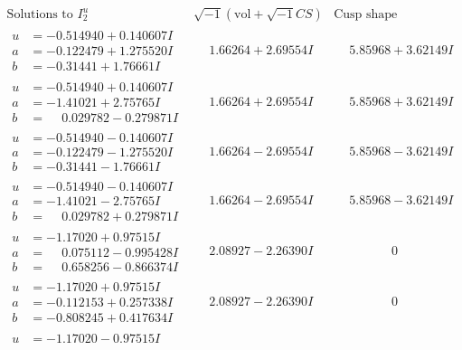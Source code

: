 \documentclass[1p]{elsarticle_modified}
\theoremstyle{definition}
\newcommand{\I}{\sqrt{-1}}
\begin{document}
$$\begin{array}{c|c|c}
\text{Solutions to }I^u_{2}& \I (\text{vol} + \sqrt{-1}CS) & \text{Cusp shape}\\
 \hline 
\begin{aligned}
u &= -0.514940 + 0.140607 I \\
a &= -0.122479 + 1.275520 I \\
b &= -0.31441 + 1.76661 I\end{aligned}
 & \phantom{-}1.66264 + 2.69554 I & \phantom{-}5.85968 + 3.62149 I \\ \hline\begin{aligned}
u &= -0.514940 + 0.140607 I \\
a &= -1.41021 + 2.75765 I \\
b &= \phantom{-}0.029782 - 0.279871 I\end{aligned}
 & \phantom{-}1.66264 + 2.69554 I & \phantom{-}5.85968 + 3.62149 I \\ \hline\begin{aligned}
u &= -0.514940 - 0.140607 I \\
a &= -0.122479 - 1.275520 I \\
b &= -0.31441 - 1.76661 I\end{aligned}
 & \phantom{-}1.66264 - 2.69554 I & \phantom{-}5.85968 - 3.62149 I \\ \hline\begin{aligned}
u &= -0.514940 - 0.140607 I \\
a &= -1.41021 - 2.75765 I \\
b &= \phantom{-}0.029782 + 0.279871 I\end{aligned}
 & \phantom{-}1.66264 - 2.69554 I & \phantom{-}5.85968 - 3.62149 I \\ \hline\begin{aligned}
u &= -1.17020 + 0.97515 I \\
a &= \phantom{-}0.075112 - 0.995428 I \\
b &= \phantom{-}0.658256 - 0.866374 I\end{aligned}
 & \phantom{-}2.08927 - 2.26390 I & \phantom{-0.000000 } 0 \\ \hline\begin{aligned}
u &= -1.17020 + 0.97515 I \\
a &= -0.112153 + 0.257338 I \\
b &= -0.808245 + 0.417634 I\end{aligned}
 & \phantom{-}2.08927 - 2.26390 I & \phantom{-0.000000 } 0 \\ \hline\begin{aligned}
u &= -1.17020 - 0.97515 I \\

\end{aligned}
\end{array}$$
\end{document}
